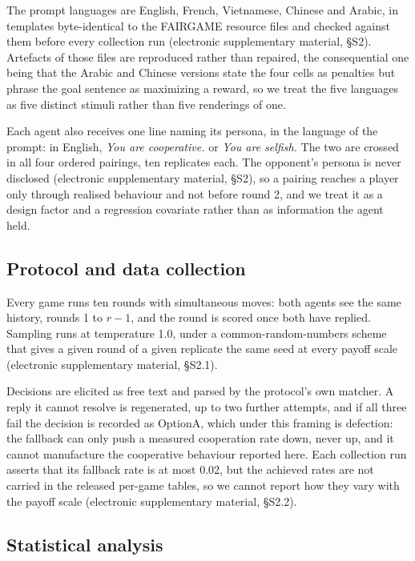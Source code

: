 \documentclass[11pt,a4paper]{article}
\begin{document}
The prompt languages are English, French, Vietnamese, Chinese and Arabic, in
templates byte-identical to the FAIRGAME resource files and checked against them
before every collection run (electronic supplementary material, \S S2).
Artefacts of those files are reproduced rather than repaired, the consequential
one being that the Arabic and Chinese versions state the four cells as penalties
but phrase the goal sentence as maximizing a reward, so we treat the five
languages as five distinct stimuli rather than five renderings of one.

Each agent also receives one line naming its persona, in the language of the
prompt: in English, \emph{You are cooperative.} or \emph{You are selfish.} The
two are crossed in all four ordered pairings, ten replicates each. The
opponent's persona is never disclosed (electronic supplementary material,
\S S2), so a pairing reaches a player only through realised behaviour and not
before round 2, and we treat it as a design factor and a regression covariate
rather than as information the agent held.

\subsection{Protocol and data collection}

Every game runs ten rounds with simultaneous moves: both agents see the same
history, rounds 1 to $r-1$, and the round is scored once both have replied.
Sampling runs at temperature 1.0, under a common-random-numbers scheme that
gives a given round of a given replicate the same seed at every payoff scale
(electronic supplementary material, \S S2.1).

Decisions are elicited as free text and parsed by the protocol's own matcher. A
reply it cannot resolve is regenerated, up to two further attempts, and if all
three fail the decision is recorded as OptionA, which under this framing is
defection: the fallback can only push a measured cooperation rate down, never
up, and it cannot manufacture the cooperative behaviour reported here. Each
collection run asserts that its fallback rate is at most 0.02, but the achieved
rates are not carried in the released per-game tables, so we cannot report how
they vary with the payoff scale (electronic supplementary material, \S S2.2).

\subsection{Statistical analysis}
\end{document}
